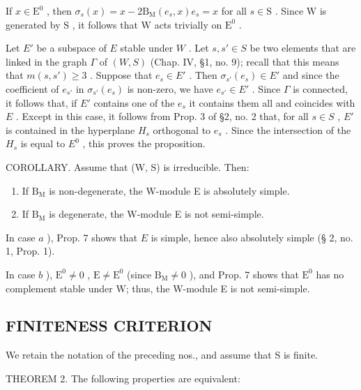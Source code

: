 If \(x \in \mathrm{E}^0\) , then \(\sigma_s(x) = x - 2\mathrm{B}_{\mathrm{M}}(e_s, x)e_s = x\) for all \(s \in \mathrm{S}\) . Since \(\mathrm{W}\) is generated by \(\mathrm{S}\) , it follows that \(\mathrm{W}\) acts trivially on \(\mathrm{E}^0\) .

Let \(E'\) be a subspace of \(E\) stable under \(W\) . Let \(s, s' \in S\) be two elements that are linked in the graph \(\Gamma\) of \((W, S)\) (Chap. IV, §1, no. 9); recall that this means that \(m(s, s') \geqslant 3\) . Suppose that \(e_s \in E'\) . Then \(\sigma_{s'}(e_s) \in E'\) and since the coefficient of \(e_{s'}\) in \(\sigma_{s'}(e_s)\) is non-zero, we have \(e_{s'} \in E'\) . Since \(\Gamma\) is connected, it follows that, if \(E'\) contains one of the \(e_s\) it contains them all and coincides with \(E\) . Except in this case, it follows from Prop. 3 of §2, no. 2 that, for all \(s \in S\) , \(E'\) is contained in the hyperplane \(H_s\) orthogonal to \(e_s\) . Since the intersection of the \(H_s\) is equal to \(E^0\) , this proves the proposition.

COROLLARY. Assume that (W, S) is irreducible. Then:

\begin{enumerate}
\def\labelenumi{\alph{enumi})}
\item
  If \(\mathrm{B_M}\) is non-degenerate, the W-module E is absolutely simple.
\item
  If \(\mathrm{B_M}\) is degenerate, the W-module E is not semi-simple.
\end{enumerate}

In case \(a\) ), Prop. 7 shows that \(E\) is simple, hence also absolutely simple (§ 2, no. 1, Prop. 1).

In case \(b\) ), \(\mathrm{E}^0 \neq 0\) , \(\mathrm{E} \neq \mathrm{E}^0\) (since \(\mathrm{B}_{\mathrm{M}} \neq 0\) ), and Prop. 7 shows that \(\mathrm{E}^0\) has no complement stable under W; thus, the W-module E is not semi-simple.

\subsection{FINITENESS CRITERION}

We retain the notation of the preceding nos., and assume that S is finite.

THEOREM 2. The following properties are equivalent:

